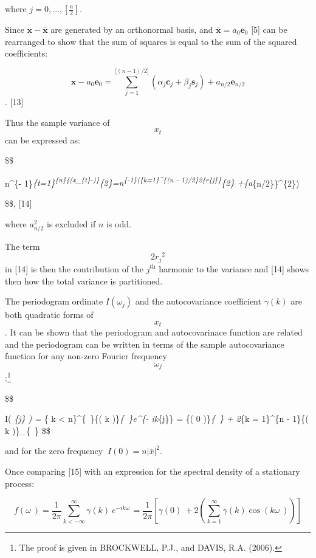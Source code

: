 \documentclass[
  letterpaper,
  DIV=11,
  numbers=noendperiod]{scrreprt}
\begin{document}
where \(j = 0,\ldots,\left\lbrack \frac{n}{2} \right\rbrack\)\emph{.}

Since \(\mathbf{x} - \overline{\mathbf{x}}\) are generated by an
orthonormal basis, and
\(\overline{\mathbf{x}}\mathbf{=}a_{0}\mathbf{e}_{0}\) {[}5{]} can be
rearranged to show that the sum of squares is equal to the sum of the
squared coefficients:

\[
 \mathbf{x} - a_{0}\mathbf{e}_{0} =\sum_{j=1}^{\lbrack(n - 1)/2\rbrack}\left(\alpha_{j}\mathbf{c}_{j}+\beta_{j}\mathbf{s}_{j}\right) + a_{n/2}\mathbf{e}_{n/2}
 \]. {[}13{]}

Thus the sample variance of \[x_{t}\] can be expressed as:

\$\$

n\^{}\{-
1\}\sum\emph{\{t=1\}\textsuperscript{\{n\}\{\left(x\_\{t\}-\right)\}}\{2\}=n\textsuperscript{\{-1\}\left(\sum\emph{\{k=1\}\^{}\{\lbrack(n
- 1)/2\rbrack\}2\{r}\{j\}\}}\{2\} +\{a}\{n/2\}\}\^{}\{2\}\right)

\$\$, {[}14{]}

where \(a_{n/2}^{2}\) is excluded if \(n\) is odd.

The term \[2{r_{j}}^{2}\] in {[}14{]} is then the contribution of the
\(j^{\text{th}}\) harmonic to the variance and {[}14{]} shows then how
the total variance is partitioned.

The periodogram ordinate \(I\left( \omega_{j} \right)\) and the
autocovariance coefficient \(\gamma(k)\) are both quadratic forms of
\[x_{t}\]. It can be shown that the periodogram and autocovarinace
function are related and the periodogram can be written in terms of the
sample autocovariance function for any non-zero Fourier frequency
\[ω_{j}\] :\footnote{The proof is given in BROCKWELL, P.J., and DAVIS,
  R.A. (2006).}

\$\$

I\left( \omega\emph{\{j\} \right) = \sum}\{\left\textbar{} k
\right\textbar{} \textless{} n\}\^{}\{~\}\{\widehat{\gamma}\left( k
\right)\}\emph{\{~\}e\^{}\{- ik\omega}\{j\}\} = \{\widehat{\gamma}\left(
0 \right)\}\emph{\{~\} + 2\sum}\{k = 1\}\^{}\{n -
1\}\{\widehat{\gamma}\left( k \right)\}\_\{~\} \$\$

and for the zero frequency
\(\ I\left( 0 \right) = n\left| \overline{x} \right|^{2}\).

Once comparing {[}15{]} with an expression for the spectral density of a
stationary process:

\[
f\left( \omega_{\ } \right) = \frac{1}{2\pi}\sum_{k < - \infty}^{\infty}{\gamma\left( k \right)}_{\ }e^{- ik\omega_{\ }} = \frac{1}{2\pi}\left\lbrack {\gamma\left( 0 \right)}_{\ } + 2\left(\sum_{k = 1}^{\infty}{\gamma\left( k \right)\cos{(k\omega_{\ })}} \right) \right\rbrack
\]
\end{document}
